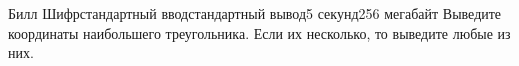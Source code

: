 \begin{problem}{Билл Шифр}{стандартный ввод}{стандартный вывод}{5 секунд}{256 мегабайт}
\OutputFile
Выведите координаты наибольшего треугольника. Если их несколько, то выведите любые из них. 

\Example

\begin{example}
%
\end{example}

\end{problem}

